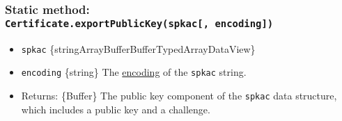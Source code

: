\begin{Shaded}
\begin{Highlighting}[]
\OperatorTok{=} \NormalTok{(}\NormalTok{)}\OperatorTok{;}
\OperatorTok{=} \NormalTok{()}\OperatorTok{;}
\OperatorTok{=}\OperatorTok{;}
\NormalTok{(}\NormalTok{))}\OperatorTok{;}
\end{Highlighting}
\end{Shaded}

\subsubsection{\texorpdfstring{Static method:
\texttt{Certificate.exportPublicKey(spkac{[},\ encoding{]})}}{Static method: Certificate.exportPublicKey(spkac{[}, encoding{]})}}\label{static-method-certificate.exportpublickeyspkac-encoding}

\begin{itemize}
\tightlist
\item
  \texttt{spkac}
  \{string\textbar ArrayBuffer\textbar Buffer\textbar TypedArray\textbar DataView\}
\item
  \texttt{encoding} \{string\} The
  \href{buffer.md\#buffers-and-character-encodings}{encoding} of the
  \texttt{spkac} string.
\item
  Returns: \{Buffer\} The public key component of the \texttt{spkac}
  data structure, which includes a public key and a challenge.
\end{itemize}

\begin{Shaded}
\begin{Highlighting}[]
\OperatorTok{=}  \NormalTok{(}\NormalTok{)}\OperatorTok{;}
\OperatorTok{=} \NormalTok{()}\OperatorTok{;}
\OperatorTok{=}\OperatorTok{;}
\OperatorTok{;}
\end{Highlighting}
\end{Shaded}

